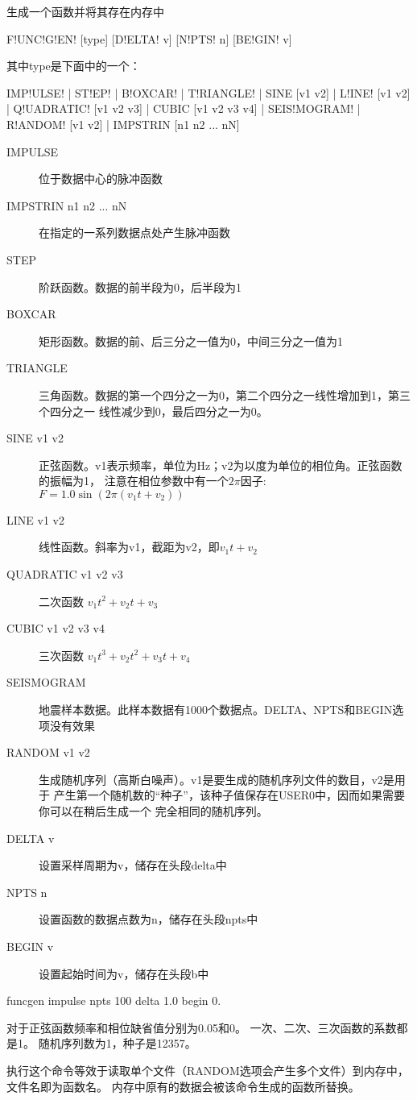 \label{cmd:funcgen}

生成一个函数并将其存在内存中

\begin{SACSTX}
F!UNC!G!EN! [type] [D!ELTA! v] [N!PTS! n] [BE!GIN! v]
\end{SACSTX}
其中type是下面中的一个：
\begin{SACSTX}
IMP!ULSE! | ST!EP! | B!OXCAR! | T!RIANGLE! | SINE [v1 v2] | L!INE! [v1 v2] |
Q!UADRATIC! [v1 v2 v3] | CUBIC [v1 v2 v3 v4] | SEIS!MOGRAM! | R!ANDOM! [v1 v2] |
IMPSTRIN  [n1 n2 ... nN]
\end{SACSTX}

\begin{description}
\item [IMPULSE] 位于数据中心的脉冲函数 
\item [IMPSTRIN n1 n2 ... nN] 在指定的一系列数据点处产生脉冲函数
\item [STEP] 阶跃函数。数据的前半段为0，后半段为1
\item [BOXCAR] 矩形函数。数据的前、后三分之一值为0，中间三分之一值为1 
\item [TRIANGLE] 三角函数。数据的第一个四分之一为0，第二个四分之一线性增加到1，第三个四分之一
    线性减少到0，最后四分之一为0。
\item [SINE v1 v2] 正弦函数。v1表示频率，单位为Hz；v2为以度为单位的相位角。正弦函数的振幅为1，
    注意在相位参数中有一个$2\pi$因子: $ F = 1.0 \sin (2\pi (v_1t+v_2))$ 
\item [LINE v1 v2] 线性函数。斜率为v1，截距为v2，即$ v_1 t + v_2 $
\item [QUADRATIC v1 v2 v3] 二次函数 $v_1 t^{2} + v_2 t + v_3 $
\item [CUBIC v1 v2 v3 v4] 三次函数 $ v_1 t^{3} + v_2 t^2 + v_3t + v_4 $
\item [SEISMOGRAM] 地震样本数据。此样本数据有1000个数据点。DELTA、NPTS和BEGIN选项没有效果
\item [RANDOM v1 v2] 生成随机序列（高斯白噪声）。v1是要生成的随机序列文件的数目，v2是用于
    产生第一个随机数的``种子''，该种子值保存在USER0中，因而如果需要你可以在稍后生成一个
    完全相同的随机序列。 
\item [DELTA v] 设置采样周期为v，储存在头段delta中 
\item [NPTS n] 设置函数的数据点数为n，储存在头段npts中 
\item [BEGIN v] 设置起始时间为v，储存在头段b中 
\end{description}

\begin{SACDFT}
funcgen impulse npts 100 delta 1.0 begin 0.
\end{SACDFT}
对于正弦函数频率和相位缺省值分别为0.05和0。
一次、二次、三次函数的系数都是1。
随机序列数为1，种子是12357。

执行这个命令等效于读取单个文件（RANDOM选项会产生多个文件）到内存中，文件名即为函数名。
内存中原有的数据会被该命令生成的函数所替换。

